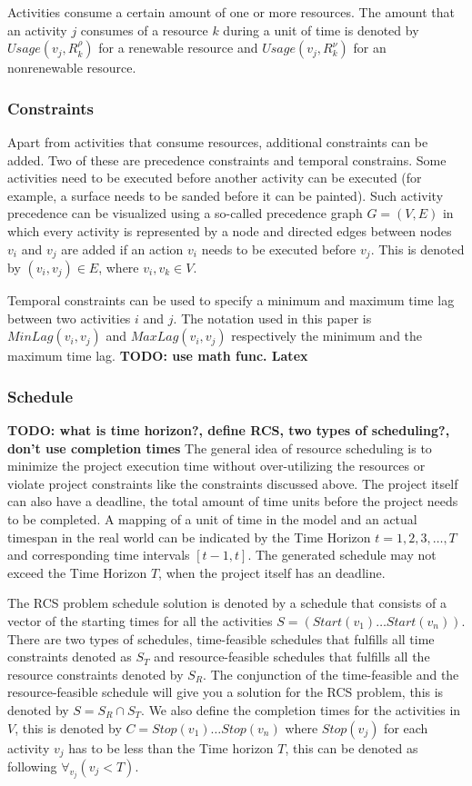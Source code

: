 \documentclass{article}
\newcommand{\TODO}[1]{{\color{red}\textbf{TODO: #1}}}
\newcommand{\renres}[0]{R^\rho} %
\newcommand{\conres}[0]{R^\nu} %
\newcommand{\usage}[1]{\textit{Usage}(#1)} %
\newcommand{\start}[1]{\textit{Start}(#1)} %
\begin{document}
Activities consume a certain amount of one or more resources.
The amount that an activity $j$ consumes of a resource $k$ during a unit of time is denoted by $\usage{v_j, \renres_k}$ for a renewable resource and   $\usage{v_j, \conres_k}$ for an nonrenewable resource.


\subsubsection{Constraints}
Apart from activities that consume resources, additional constraints can be added.
Two of these are precedence constraints and temporal constrains.
Some activities need to be executed before another activity can be executed (for example, a surface needs to be sanded before it can be painted).
Such activity precedence can be visualized using a so-called precedence graph $G = (V, E)$ in which every activity is represented by a node and directed edges between nodes $v_i$ and $v_j$ are added if an action $v_i$ needs to be executed before $v_j$.
This is denoted by $(v_i,v_j) \in E$, where $v_i, v_k \in V$.

Temporal constraints can be used to specify a minimum and maximum time lag between two activities $i$ and $j$.
The notation used in this paper is $MinLag(v_i, v_j)$ and $MaxLag(v_i, v_j)$ respectively the minimum and the maximum time lag.
\TODO{use math func. Latex}

\subsubsection{Schedule}
\TODO{what is time horizon?, define RCS, two types of scheduling?, don't use completion times}
The general idea of resource scheduling is to minimize the project execution time without over-utilizing the resources or violate project constraints like the constraints discussed above.
The project itself can also have a deadline, the total amount of time units before the project needs to be completed.
A mapping of a unit of time in the model and an actual timespan in the real world can be indicated by the Time Horizon $t=1,2,3,\ldots,T$ and corresponding time intervals $[t-1,t]$.
The generated schedule may not exceed the Time Horizon $T$, when the project itself has an deadline.

The RCS problem schedule solution is denoted by a schedule that consists of a vector of the starting times for all the activities $S =  (\start{v_1} \ldots \start{v_n})$.
There are two types of schedules, time-feasible schedules that fulfills all time constraints denoted as $S_T$ and resource-feasible schedules that fulfills all the resource constraints denoted by $S_R$.
The conjunction of the time-feasible and the resource-feasible schedule will give you a solution for the RCS problem, this is denoted by $S = S_R \cap S_T$.
We also define the completion times for the activities in $V$, this is denoted by $C = Stop(v_1) \ldots Stop(v_n)$ where $Stop(v_j)$ for each activity $v_j$ has to be less than the Time horizon $T$, this can be denoted as following $\forall_{v_j}(v_j < T)$.
\end{document}

